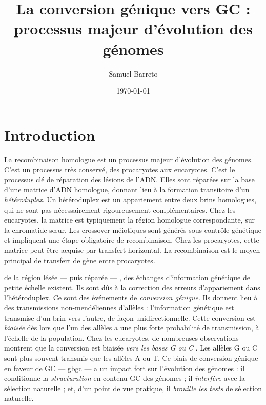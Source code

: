 \documentclass[11pt, oneside]{scrartcl}
\author{Samuel Barreto}
\date{\today}
\title{La conversion génique vers GC : processus majeur d'évolution des génomes}
\begin{document}


\section*{Introduction}
\label{sec:orgheadline1}
La recombinaison homologue est un processus majeur d'évolution des génomes.
C'est un processus très conservé, des procaryotes aux
eucaryotes\cite{cromie_recombination_2001}. C'est le processus clé de réparation
des lésions de l'ADN. Elles sont réparées sur la base d'une matrice d'ADN
homologue, donnant lieu à la formation transitoire d'un \emph{hétéroduplex}. Un
hétéroduplex est un appariement entre deux brins homologues, qui ne sont pas
nécessairement rigoureusement complémentaires. Chez les eucaryotes, la matrice
est typiquement la région homologue correspondante, sur la chromatide sœur. Les
crossover méiotiques sont générés sous contrôle génétique et impliquent une
étape obligatoire de recombinaison\cite{mancera_high-resolution_2008}. Chez les
procaryotes, cette matrice peut être acquise par transfert horizontal. La
recombinaison est le moyen principal de transfert de gène entre procaryotes.

 de la région lésée --- puis réparée --- , des échanges
d'information génétique de petite échelle existent\cite{duret_biased_2009}. Ils
sont dûs à la correction des erreurs d'appariement dans l'hétéroduplex. Ce sont
des événements de \emph{conversion génique}. Ils donnent lieu à des transmissions
non-mendéliennes d'allèles : l'information génétique est transmise d'un brin
vers l'autre, de façon unidirectionnelle. Cette conversion est \emph{biaisée} dès
lors que l'un des allèles a une plus forte probabilité de transmission, à
l'échelle de la population. Chez les eucaryotes, de nombreuses observations
montrent que la conversion est biaisée \emph{vers les bases G ou C}
\cite{pessia_evidence_2012, mancera_high-resolution_2008, duret_impact_2008}.
Les allèles G ou C sont plus souvent transmis que les allèles A ou T. Ce biais
de conversion génique en faveur de GC --- \ac{gbgc} --- a un impact fort sur
l'évolution des génomes : il conditionne la \emph{structuration} en contenu GC des
génomes\cite{duret_impact_2008} ; il \emph{interfère} avec la sélection
naturelle\cite{galtier_gc-biased_2009} ; et, d'un point de vue pratique, il
\emph{brouille les tests} de sélection naturelle\cite{ratnakumar_detecting_2010}.
\end{document}
